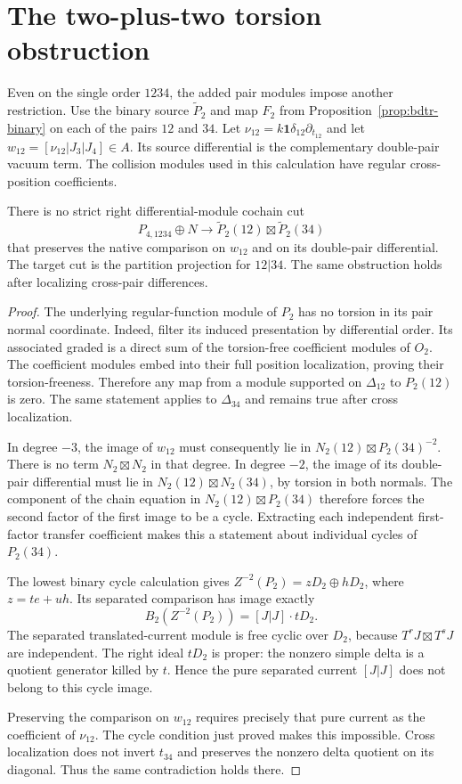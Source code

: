 \section{The two-plus-two torsion obstruction}

Even on the single order $1234$, the added pair modules impose another restriction.
Use the binary source $\widetilde P_2$ and map $F_2$ from Proposition~\ref{prop:bdtr-binary} on each of the pairs $12$ and $34$.
Let $\nu_{12}=k\mathbf1\delta_{12}\partial_{t_{12}}$ and let $w_{12}=[\nu_{12}|J_3|J_4]\in A$.
Its source differential is the complementary double-pair vacuum term.
The collision modules used in this calculation have regular cross-position coefficients.

\begin{proposition}\label{prop:bdfour-cut-obstruction}
There is no strict right differential-module cochain cut
\[
 P_{4,1234}\oplus N\longrightarrow
 \widetilde P_2(12)\boxtimes\widetilde P_2(34)
\]
that preserves the native comparison on $w_{12}$ and on its double-pair differential.
The target cut is the partition projection for $12|34$.
The same obstruction holds after localizing cross-pair differences.
\end{proposition}
\begin{proof}
The underlying regular-function module of $P_2$ has no torsion in its pair normal coordinate.
Indeed, filter its induced presentation by differential order.
Its associated graded is a direct sum of the torsion-free coefficient modules of $O_2$.
The coefficient modules embed into their full position localization, proving their torsion-freeness.
Therefore any map from a module supported on $\Delta_{12}$ to $P_2(12)$ is zero.
The same statement applies to $\Delta_{34}$ and remains true after cross localization.

In degree $-3$, the image of $w_{12}$ must consequently lie in
$N_2(12)\boxtimes P_2(34)^{-2}$.
There is no term $N_2\boxtimes N_2$ in that degree.
In degree $-2$, the image of its double-pair differential must lie in
$N_2(12)\boxtimes N_2(34)$, by torsion in both normals.
The component of the chain equation in $N_2(12)\boxtimes P_2(34)$ therefore forces the second factor of the first image to be a cycle.
Extracting each independent first-factor transfer coefficient makes this a statement about individual cycles of $P_2(34)$.

The lowest binary cycle calculation gives
$Z^{-2}(P_2)=zD_2\oplus hD_2$, where $z=te+uh$.
Its separated comparison has image exactly
\[
 B_2(Z^{-2}(P_2))=[J|J]\cdot tD_2.
\]
The separated translated-current module is free cyclic over $D_2$, because $T^rJ\boxtimes T^sJ$ are independent.
The right ideal $tD_2$ is proper: the nonzero simple delta is a quotient generator killed by $t$.
Hence the pure separated current $[J|J]$ does not belong to this cycle image.

Preserving the comparison on $w_{12}$ requires precisely that pure current as the coefficient of $\nu_{12}$.
The cycle condition just proved makes this impossible.
Cross localization does not invert $t_{34}$ and preserves the nonzero delta quotient on its diagonal.
Thus the same contradiction holds there.
\end{proof}
